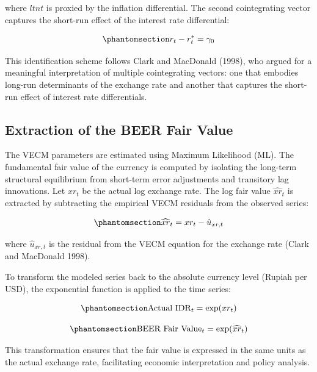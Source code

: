 \documentclass[
  manuscript=article,
  layout=publish,
  year=2026,
  volume=6,
]{den}
\begin{document}
where \(ltnt\) is proxied by the inflation differential. The second
cointegrating vector captures the short-run effect of the interest rate
differential:

\begin{equation}\phantomsection\label{eq-cointegrating-vector2}{
r_t - r_t^* = \gamma_0
}\end{equation}

This identification scheme follows Clark and MacDonald (1998), who
argued for a meaningful interpretation of multiple cointegrating
vectors: one that embodies long-run determinants of the exchange rate
and another that captures the short-run effect of interest rate
differentials.

\subsection{Extraction of the BEER Fair Value}\label{sec-fair-value}

The VECM parameters are estimated using Maximum Likelihood (ML). The
fundamental fair value of the currency is computed by isolating the
long-term structural equilibrium from short-term error adjustments and
transitory lag innovations. Let \(xr_t\) be the actual log exchange
rate. The log fair value \(\widehat{xr}_t\) is extracted by subtracting
the empirical VECM residuals from the observed series:

\begin{equation}\phantomsection\label{eq-fair-value-log}{
\widehat{xr}_t = xr_t - \hat{u}_{xr, t}
}\end{equation}

where \(\hat{u}_{xr, t}\) is the residual from the VECM equation for the
exchange rate (Clark and MacDonald 1998).

To transform the modeled series back to the absolute currency level
(Rupiah per USD), the exponential function is applied to the time
series:

\begin{equation}\phantomsection\label{eq-actual-level}{
\text{Actual IDR}_t = \exp(xr_t)
}\end{equation}

\begin{equation}\phantomsection\label{eq-fair-value-level}{
\text{BEER Fair Value}_t = \exp(\widehat{xr}_t)
}\end{equation}

This transformation ensures that the fair value is expressed in the same
units as the actual exchange rate, facilitating economic interpretation
and policy analysis.
\end{document}
